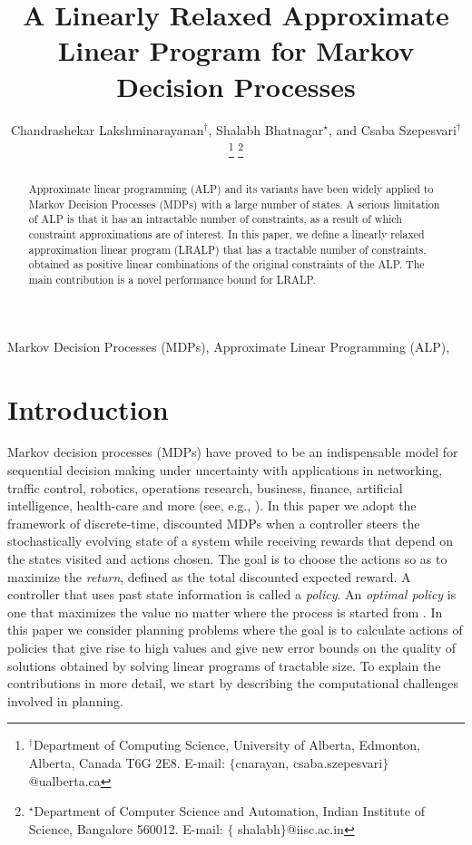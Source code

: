 \documentclass[twocolumn]{IEEEtran}
\title{A Linearly Relaxed Approximate Linear Program for Markov Decision Processes}
\author{Chandrashekar Lakshminarayanan$^\dagger$, Shalabh Bhatnagar$^\star$,
 and Csaba Szepesvari$^\dagger$
\thanks{$^\dagger$Department of Computing Science, University of Alberta,
Edmonton, Alberta, Canada T6G 2E8. E-mail: $\{$cnarayan, csaba.szepesvari$\}$@ualberta.ca}
\thanks{$^\star$Department of Computer
Science and Automation, Indian Institute of Science, Bangalore 560012.
E-mail: $\{$ shalabh$\}$@iisc.ac.in}
}
\begin{document}
\maketitle

\begin{abstract}
Approximate linear programming (ALP) and its variants have been widely applied to Markov Decision Processes (MDPs) with a large number of states. A serious limitation of ALP is that it has an intractable number of constraints, as a result of which constraint approximations are of interest. In this paper, we define a linearly relaxed approximation linear program (LRALP) that has a tractable number of constraints, obtained as positive linear combinations of the original constraints of the ALP. The main contribution is a novel performance bound for LRALP.
\end{abstract}
\begin{keywords}{
Markov Decision Processes (MDPs), Approximate Linear Programming (ALP), %
}
\end{keywords}
\section{Introduction}
Markov decision processes (MDPs) have proved to be an indispensable model for sequential decision making under uncertainty with applications in networking, traffic control, robotics, operations research, business, finance, artificial intelligence, health-care and more (see, e.g., \cite{
White93:Apps,
rust96:book,
FeiSh02:MDPHandbook,
QiWu07,
SiBu10:MDPinAI,
BauRie:11,Puter,
LeLiu12:RLBook,
Abuetal15:MDPWireless,
BouDi17:MDPPractice}).
In this paper we adopt the framework of discrete-time, discounted MDPs when
a controller steers the stochastically evolving state of a system while receiving
rewards that depend on the states visited and actions chosen. The goal is to choose the actions so as to maximize the \emph{return}, defined as the total discounted expected reward. A controller that uses past state information is called a \emph{policy}. An \emph{optimal policy} is one that maximizes the value no matter where the process is started from \cite{Puter}.
In this paper we consider planning problems where the goal is to calculate actions of policies that give rise to high values
and give new error bounds on the quality of solutions obtained by solving linear programs of tractable size.
To explain the contributions in more detail, we start by describing the computational challenges involved in planning.
\end{document}
